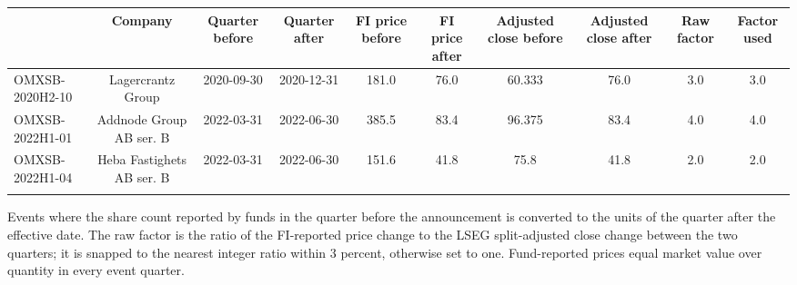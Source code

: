\begin{threeparttable}
\begingroup
\renewcommand\cellalign{t}
\renewcommand\arraystretch{1}
\setlength{\tabcolsep}{5pt}
\begin{tabular}{@{}lccccccccc}
\toprule
 & Company & Quarter before & Quarter after & FI price before & FI price after & Adjusted close before & Adjusted close after & Raw factor & Factor used \\
\midrule
\addlinespace[1ex]
OMXSB-2020H2-10 & Lagercrantz Group & 2020-09-30 & 2020-12-31 & 181.0 & 76.0 & 60.333 & 76.0 & 3.0 & 3.0 \\
\addlinespace[0.25ex]
\addlinespace[0.25ex]
OMXSB-2022H1-01 & Addnode Group AB ser. B & 2022-03-31 & 2022-06-30 & 385.5 & 83.4 & 96.375 & 83.4 & 4.0 & 4.0 \\
\addlinespace[0.25ex]
\addlinespace[0.25ex]
OMXSB-2022H1-04 & Heba Fastighets AB ser. B & 2022-03-31 & 2022-06-30 & 151.6 & 41.8 & 75.8 & 41.8 & 2.0 & 2.0 \\
\addlinespace[0.25ex]
\bottomrule
\end{tabular}
\endgroup
\noindent\begin{minipage}{\linewidth}\smallskip\footnotesize
Events where the share count reported by funds in the quarter before the announcement is converted to the units of the quarter after the effective date. The raw factor is the ratio of the FI-reported price change to the LSEG split-adjusted close change between the two quarters; it is snapped to the nearest integer ratio within 3 percent, otherwise set to one. Fund-reported prices equal market value over quantity in every event quarter.\end{minipage}

\end{threeparttable}